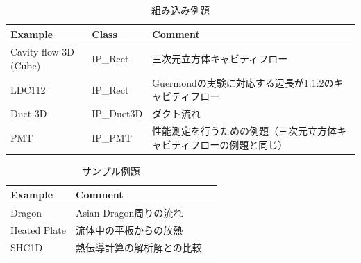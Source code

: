 \begin{table}[htdp]
\caption{組み込み例題}
\begin{center}
\small
\begin{tabular}{lll} \toprule
Example & Class & Comment\\ \midrule
Cavity flow 3D (Cube) & IP\_Rect & 三次元立方体キャビティフロー\\
LDC112  & IP\_Rect & Guermondの実験に対応する辺長が1:1:2のキャビティフロー\\ 
Duct 3D & IP\_Duct3D & ダクト流れ\\ 
PMT & IP\_PMT & 性能測定を行うための例題（三次元立方体キャビティフローの例題と同じ）\\
\bottomrule
\end{tabular}
\end{center}
\label{tbl:example at glance}
\end{table}

\begin{table}[htdp]
\caption{サンプル例題}
\begin{center}
\small
\begin{tabular}{lll} \toprule
Example & Comment\\ \midrule
Dragon & Asian Dragon周りの流れ\\
Heated Plate & 流体中の平板からの放熱\\
SHC1D & 熱伝導計算の解析解との比較\\ \bottomrule
\end{tabular}
\end{center}
\label{tbl:exercise}
\end{table}

